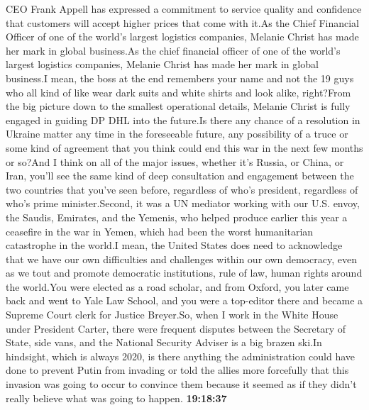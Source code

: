 \documentclass{article}%
\begin{document}
CEO Frank Appell has expressed a commitment to service quality and confidence that customers will accept higher prices that come with it.As the Chief Financial Officer of one of the world's largest logistics companies, Melanie Christ has made her mark in global business.As the chief financial officer of one of the world's largest logistics companies, Melanie Christ has made her mark in global business.I mean, the boss at the end remembers your name and not the 19 guys who all kind of like wear dark suits and white shirts and look alike, right?From the big picture down to the smallest operational details, Melanie Christ is fully engaged in guiding DP DHL into the future.Is there any chance of a resolution in Ukraine matter any time in the foreseeable future, any possibility of a truce or some kind of agreement that you think could end this war in the next few months or so?And I think on all of the major issues, whether it's Russia, or China, or Iran, you'll see the same kind of deep consultation and engagement between the two countries that you've seen before, regardless of who's president, regardless of who's prime minister.Second, it was a UN mediator working with our U.S. envoy, the Saudis, Emirates, and the Yemenis, who helped produce earlier this year a ceasefire in the war in Yemen, which had been the worst humanitarian catastrophe in the world.I mean, the United States does need to acknowledge that we have our own difficulties and challenges within our own democracy, even as we tout and promote democratic institutions, rule of law, human rights around the world.You were elected as a road scholar, and from Oxford, you later came back and went to Yale Law School, and you were a top{-}editor there and became a Supreme Court clerk for Justice Breyer.So, when I work in the White House under President Carter, there were frequent disputes between the Secretary of State, side vans, and the National Security Adviser is a big brazen ski.In hindsight, which is always 2020, is there anything the administration could have done to prevent Putin from invading or told the allies more forcefully that this invasion was going to occur to convince them because it seemed as if they didn't really believe what was going to happen.%
\textbf{19:18:37}%
\newline%
\end{document}
